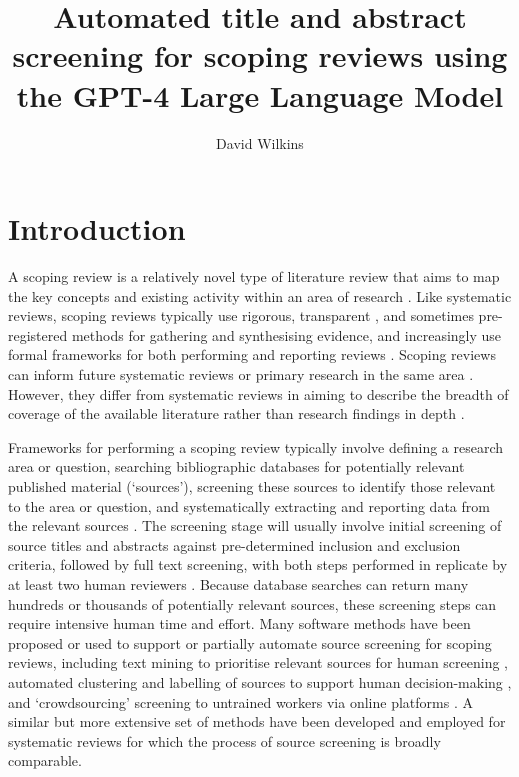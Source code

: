 \documentclass[10pt,a4paper,twocolumn]{article}
\begin{document}
\title{Automated title and abstract screening for scoping reviews using the GPT-4 Large Language Model}
\author[1]{David Wilkins}
\maketitle

\section{Introduction}

A scoping review is a relatively novel type of literature review that aims to map the key concepts and existing activity within an area of research \cite{Arksey.2005}. Like systematic reviews, scoping reviews typically use rigorous, transparent \cite{Pham.2014}, and sometimes pre-registered methods for gathering and synthesising evidence, and increasingly use formal frameworks for both performing and reporting reviews \cite{Peters.2021}. Scoping reviews can inform future systematic reviews or primary research in the same area \cite{Sutton.2019}. However, they differ from systematic reviews in aiming to describe the breadth of coverage of the available literature rather than research findings in depth \cite{Arksey.2005}.

Frameworks for performing a scoping review typically involve defining a research area or question, searching bibliographic databases for potentially relevant published material (`sources'), screening these sources to identify those relevant to the area or question, and systematically extracting and reporting data from the relevant sources \cite{JBI.2015, Arksey.2005}. The screening stage will usually involve initial screening of source titles and abstracts against pre-determined inclusion and exclusion criteria, followed by full text screening, with both steps performed in replicate by at least two human reviewers \cite{Peters.2020, JBI.2020, Pham.2014}. Because database searches can return many hundreds or thousands of potentially relevant sources, these screening steps can require intensive human time and effort. Many software methods have been proposed or used to support or partially automate source screening for scoping reviews, including text mining to prioritise relevant sources for human screening \cite{Shemilt.2014, Howard.2016, Chai.2021}, automated clustering and labelling of sources to support human decision-making \cite{Stansfield.2013}, and `crowdsourcing' screening to untrained workers via online platforms \cite{Mortensen.2017}. A similar but more extensive set of methods have been developed and employed for systematic reviews \cite{Khalil.2022, Gates.2019} for which the process of source screening is broadly comparable.
\end{document}
